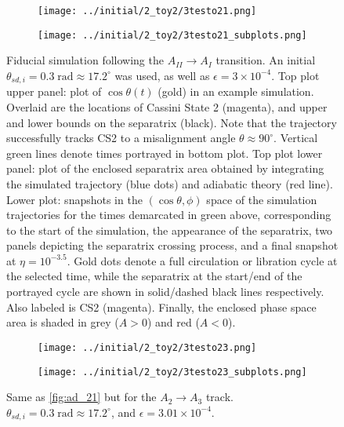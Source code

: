 \documentclass[
        fleqn,
        usenatbib,
    ]{mnras}
\newcommand*{\p}[1]{\left(#1\right)}
\begin{document}
\begin{figure}
    \centering
    \begin{subfigure}{\columnwidth}
        \centering
        \texttt{[image: ../initial/2\_toy2/3testo21.png]}
    \end{subfigure}
    \begin{subfigure}{\columnwidth}
        \centering
        \texttt{[image: ../initial/2\_toy2/3testo21\_subplots.png]}
    \end{subfigure}
    \caption{Fiducial simulation following the $A_{II} \to A_{I}$ transition. An
    initial $\theta_{sd, i} = 0.3\;\mathrm{rad} \approx 17.2^\circ$ was used, as
    well as $\epsilon = 3 \times 10^{-4}$. Top plot upper panel: plot of $\cos
    \theta(t)$ (gold) in an example simulation. Overlaid are the locations of
    Cassini State 2 (magenta), and upper and lower bounds on the separatrix
    (black). Note that the trajectory successfully tracks CS2 to a misalignment
    angle $\theta \approx 90^\circ$. Vertical green lines denote times portrayed
    in bottom plot. Top plot lower panel: plot of the enclosed separatrix area
    obtained by integrating the simulated trajectory (blue dots) and adiabatic
    theory (red line). Lower plot: snapshots in the $\p{\cos \theta, \phi}$
    space of the simulation trajectories for the times demarcated in green
    above, corresponding to the start of the simulation, the appearance of the
    separatrix, two panels depicting the separatrix crossing process, and a
    final snapshot at $\eta = 10^{-3.5}$. Gold dots denote a full circulation or
    libration cycle at the selected time, while the separatrix at the start/end
    of the portrayed cycle are shown in solid/dashed black lines respectively.
    Also labeled is CS2 (magenta). Finally, the enclosed phase space area is
    shaded in grey ($A > 0$) and red ($A < 0$).}\label{fig:ad_21}
\end{figure}
\begin{figure}
    \centering
    \begin{subfigure}{\columnwidth}
        \centering
        \texttt{[image: ../initial/2\_toy2/3testo23.png]}
    \end{subfigure}
    \begin{subfigure}{\columnwidth}
        \centering
        \texttt{[image: ../initial/2\_toy2/3testo23\_subplots.png]}
    \end{subfigure}
    \caption{Same as \autoref{fig:ad_21} but for the $A_2 \to A_3$ track.
    $\theta_{sd, i} = 0.3\;\mathrm{rad} \approx 17.2^\circ$, and $\epsilon =
    3.01 \times 10^{-4}$.}\label{fig:ad_23}
\end{figure}
\end{document}
